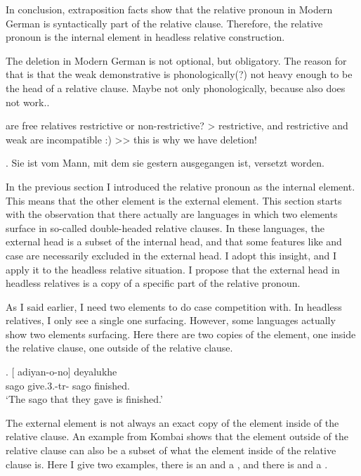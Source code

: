  In conclusion, extraposition facts show that the relative pronoun in Modern German is syntactically part of the relative clause. Therefore, the relative pronoun is the internal element in headless relative construction.


 The deletion in Modern German is not optional, but obligatory. The reason for that is that the weak demonstrative is phonologically(?) not heavy enough to be the head of a relative clause. Maybe not only phonologically, because  also does not work..

 are free relatives restrictive or non-restrictive? > restrictive, and restrictive and weak are incompatible :)  >> this is why we have deletion!

 \ex. Sie ist vom Mann, mit dem sie gestern ausgegangen ist, versetzt worden.




 In the previous section I introduced the relative pronoun as the internal element. This means that the other element is the external element. This section starts with the observation that there actually are languages in which two elements surface in so-called double-headed relative clauses. In these languages, the external head is a subset of the internal head, and that some features like  and case are necessarily excluded in the external head. I adopt this insight, and I apply it to the headless relative situation. I propose that the external head in headless relatives is a copy of a specific part of the relative pronoun.

 As I said earlier, I need two elements to do case competition with. In headless relatives, I only see a single one surfacing. However, some languages actually show two elements surfacing. Here there are two copies of the element, one inside the relative clause, one outside of the relative clause.

 \exg. [ adiyan-o-no]  deyalukhe\\
  sago give.3.-{tr}- sago finished.\\
  `The sago that they gave is finished.' 

 The external element is not always an exact copy of the element inside of the relative clause. An example from Kombai shows that the element outside of the relative clause can also be a subset of what the element inside of the relative clause is. Here I give two examples, there is an  and a , and there is  and a .


